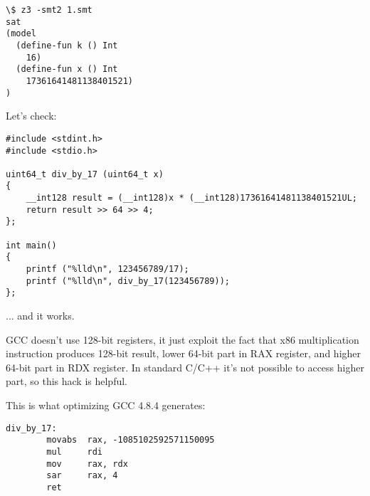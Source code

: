 \begin{lstlisting}
\$ z3 -smt2 1.smt
sat
(model
  (define-fun k () Int
    16)
  (define-fun x () Int
    17361641481138401521)
)
\end{lstlisting}

Let's check:

\begin{lstlisting}
#include <stdint.h>
#include <stdio.h>

uint64_t div_by_17 (uint64_t x)
{
	__int128 result = (__int128)x * (__int128)17361641481138401521UL;
	return result >> 64 >> 4;
};

int main()
{
	printf ("%lld\n", 123456789/17);
	printf ("%lld\n", div_by_17(123456789));
};
\end{lstlisting}

... and it works.

GCC doesn't use 128-bit registers, it just exploit the fact that x86 multiplication instruction produces 128-bit result, lower 64-bit part in RAX register,
and higher 64-bit part in RDX register.
In standard C/C++ it's not possible to access higher part, so this hack is helpful.

This is what optimizing GCC 4.8.4 generates:

\begin{lstlisting}
div_by_17:
        movabs  rax, -1085102592571150095
        mul     rdi
        mov     rax, rdx
        sar     rax, 4
        ret
\end{lstlisting}

